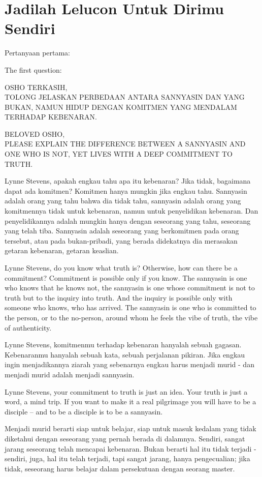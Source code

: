 \chapter{Jadilah Lelucon Untuk Dirimu Sendiri} %

\bahasa
Pertanyaan pertama:

\english
The first question:

\bahasa
OSHO TERKASIH,\\
TOLONG JELASKAN PERBEDAAN ANTARA SANNYASIN DAN YANG BUKAN, NAMUN HIDUP DENGAN KOMITMEN YANG MENDALAM TERHADAP KEBENARAN.

\english
BELOVED OSHO,\\
PLEASE EXPLAIN THE DIFFERENCE BETWEEN A SANNYASIN AND ONE WHO IS NOT, YET LIVES WITH A DEEP COMMITMENT TO TRUTH.

\bahasa
Lynne Stevens, apakah engkau tahu apa itu kebenaran? Jika tidak, bagaimana dapat ada komitmen? Komitmen hanya mungkin jika engkau tahu. Sannyasin adalah orang yang tahu bahwa dia tidak tahu, sannyasin adalah orang yang komitmennya tidak untuk kebenaran, namun untuk penyelidikan kebenaran. Dan penyelidikannya adalah mungkin hanya dengan seseorang yang tahu, seseorang yang telah tiba. Sannyasin adalah seseorang yang berkomitmen pada orang tersebut, atau pada bukan-pribadi, yang berada didekatnya dia merasakan getaran kebenaran, getaran keaslian.

\english
Lynne Stevens, do you know what truth is? Otherwise, how can there be a commitment? Commitment is possible only if you know. The sannyasin is one who knows that he knows not, the sannyasin is one whose commitment is not to truth but to the inquiry into truth. And the inquiry is possible only with someone who knows, who has arrived. The sannyasin is one who is committed to the person, or to the no-person, around whom he feels the vibe of truth, the vibe of authenticity.

\bahasa
Lynne Stevens, komitmenmu terhadap kebenaran hanyalah sebuah gagasan. Kebenaranmu hanyalah sebuah kata, sebuah perjalanan pikiran. Jika engkau ingin menjadikannya ziarah yang sebenarnya engkau harus menjadi murid - dan menjadi murid adalah menjadi sannyasin.

\english
Lynne Stevens, your commitment to truth is just an idea. Your truth is just a word, a mind trip. If you want to make it a real pilgrimage you will have to be a disciple -- and to be a disciple is to be a sannyasin.

\bahasa
Menjadi murid berarti siap untuk belajar, siap untuk masuk kedalam yang tidak diketahui dengan seseorang yang pernah berada di dalamnya. Sendiri, sangat jarang seseorang telah mencapai kebenaran. Bukan berarti hal itu tidak terjadi - sendiri, juga, hal itu telah terjadi, tapi sangat jarang, hanya pengecualian; jika tidak, seseorang harus belajar dalam persekutuan dengan seorang master.

